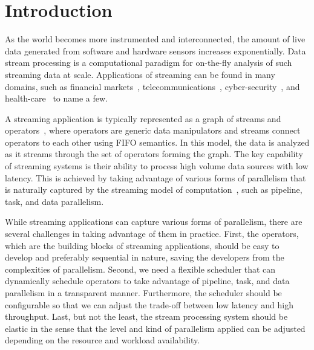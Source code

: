  \section{Introduction}\label{sec:introduction}

As the world becomes more instrumented and interconnected, the amount of live
data generated from software and hardware sensors increases exponentially.
Data stream processing is a computational paradigm for on-the-fly analysis of
such streaming data at scale. Applications of streaming can be found in many
domains, such as financial markets~\cite{ref:app-finance},
telecommunications~\cite{ref:app-telco},
cyber-security~\cite{ref:app-cybersecurity}, and
health-care~\cite{ref:app-healthcare} to name a few.

A streaming application is typically represented as a graph of streams and
operators~\cite{ref:spl}, where operators are generic data manipulators and
streams connect operators to each other using FIFO semantics. In this model,
the data is analyzed as it streams through the set of operators forming the
graph. The key capability of streaming systems is their ability to process
high volume data sources with low latency. This is achieved by taking
advantage of various forms of parallelism that is naturally captured by the
streaming model of computation~\cite{ref:survey}, such as pipeline, task, and
data parallelism.

While streaming applications can capture various forms of parallelism, there
are several challenges in taking advantage of them in practice. First, the
operators, which are the building blocks of streaming applications, should be
easy to develop and preferably sequential in nature, saving the developers
from the complexities of parallelism. Second, we need a flexible scheduler
that can dynamically schedule operators to take advantage of pipeline, task,
and data parallelism in a transparent manner. Furthermore, the scheduler
should be configurable so that we can adjust the trade-off between low latency
and high throughput. Last, but not the least, the stream processing system
should be elastic in the sense that the level and kind of parallelism applied
can be adjusted depending on the resource and workload availability.

